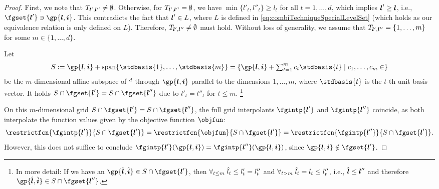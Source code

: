 \begin{proof}
  First, we note that $T_{{\boldsymbol{l}}',{\boldsymbol{l}}''} \not= \emptyset$.
  Otherwise, for $T_{{\boldsymbol{l}}',{\boldsymbol{l}}''} = \emptyset$,
  we have $\min\{l'_t, l''_t\} \ge l_t$
  for all $t = 1, \dotsc, d$, which implies ${\boldsymbol{l}}' \ge {\boldsymbol{l}}$, i.e.,
  $\fgset{\*l'} \ni \gp{\*l,\*i}$.
  This contradicts the fact that ${\boldsymbol{l}}' \in L$, where $L$ is defined
  in \eqref{eq:combiTechniqueSpecialLevelSet}
  (which holds as our equivalence relation is only defined on $L$).
  Therefore, $T_{{\boldsymbol{l}}',{\boldsymbol{l}}''} \not= \emptyset$ must hold.
  Without loss of generality,
  we assume that $T_{{\boldsymbol{l}}',{\boldsymbol{l}}''} = \{1, \dotsc, m\}$
  for some $m \in \{1, \dotsc, d\}$.
  
  Let
  \begin{equation}
    S := \gp{\*l,\*i} + \spn\{\stdbasis{1}, \dotsc, \stdbasis{m}\}
    = \{\gp{\*l,\*i} + \textstyle\sum_{t=1}^m c_t \stdbasis{t} \mid
    c_1, \dotsc, c_m \in \real\}
  \end{equation}
  be the $m$-dimensional affine subspace of $\real^d$
  through $\gp{\*l, \*i}$
  parallel to the dimensions $1, \dotsc, m$,
  where $\stdbasis{t}$ is the $t$-th unit basis vector.
  It holds $S \cap \fgset{\*l'} = S \cap \fgset{\*l''}$ due to
  $l'_t = l''_t$ for $t \le m$.%
  \footnote{%
    In more detail:
    If we have an $\gp{\hat{\*l},\hat{\*i}} \in S \cap \fgset{\*l'}$,
    then $\forall_{t \le m}\;\hat{l}_t \le l'_t = l''_t$ and
    $\forall_{t > m}\;\hat{l}_t = l_t \le l''_t$, i.e.,
    $\hat{{\boldsymbol{l}}} \le {\boldsymbol{l}}''$ and therefore
    $\gp{\hat{\*l},\hat{\*i}} \in S \cap \fgset{\*l''}$.%
  }
  
  On this $m$-dimensional grid $S \cap \fgset{\*l'} = S \cap \fgset{\*l''}$,
  the full grid interpolants $\fgintp{\*l'}$ and $\fgintp{\*l''}$
  coincide, as both interpolate the function values given by
  the objective function $\objfun$:
  \begin{equation}
    \label{eq:proofCombiTechniqueIdenticalValues1}
    \restrictfcn{\fgintp{\*l'}}{S \cap \fgset{\*l'}}
    = \restrictfcn{\objfun}{S \cap \fgset{\*l'}}
    =  \restrictfcn{\fgintp{\*l''}}{S \cap \fgset{\*l'}}.
  \end{equation}
  However, this does not suffice to conclude
  $\fgintp{\*l'}(\gp{\*l,\*i}) = \fgintp{\*l''}(\gp{\*l,\*i})$,
  since $\gp{\*l,\*i} \notin \fgset{\*l'}$.
  

\end{proof}
